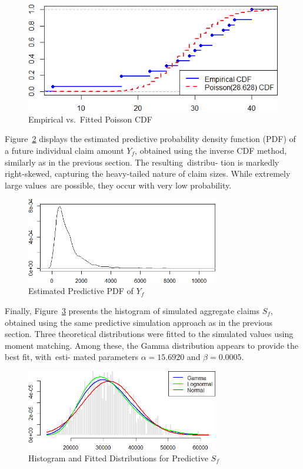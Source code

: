 \documentclass{Class/julia}
\begin{document}
\begin{figure}[!ht]
    \centering
    \caption{Empirical vs.\ Fitted Poisson CDF}
    \label{fig:17}
    \includegraphics[width=.75\textwidth]{itamtplcost/empirical_vs_poisson.png}
\end{figure}

Figure~\ref{fig:18} displays the estimated predictive probability density function (PDF) of a future individual claim amount \( Y_f \), obtained using the inverse CDF method, similarly as in the previous section. The resulting~distribu- tion is markedly right-skewed, capturing the heavy-tailed nature of claim sizes. While extremely large values~are possible, they occur with very low probability.

\begin{figure}[!ht]
\centering
\caption{Estimated Predictive PDF of \( Y_f \) }
\label{fig:18}
\includegraphics[width=0.75\textwidth]{itamtplcost/predictive_Y_f.png}
\end{figure}

Finally, Figure~\ref{fig:19} presents the histogram of simulated aggregate claims \( S_f \), obtained using the same predictive simulation approach as in the previous section. Three theoretical distributions were fitted to the simulated values using moment matching. Among these, the Gamma distribution appears to provide the best fit, with~esti- mated parameters \( \alpha = 15.6920 \) and \( \beta = 0.0005 \).

\begin{figure}[!ht]
\centering
\caption{Histogram and Fitted Distributions for Predictive \( S_f \)}
\label{fig:19}
\includegraphics[width=0.75\textwidth]{itamtplcost/predictive_S_f.png}
\end{figure}
\end{document}
